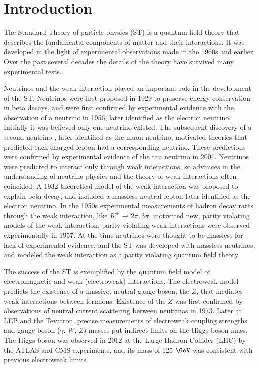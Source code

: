 \chapter{Introduction}
\label{intro_chapter}

The Standard Theory of particle physics (ST) \cite{weinbergSM,salamSM} 
is a quantum field theory that describes the fundamental components of matter and their interactions.  It 
was developed in the light of experimental observations made in the 1960s and earlier.  Over the past 
several decades the details of the theory have survived many experimental tests.

Neutrinos and the weak interaction played an important role in the development of the ST.  
Neutrinos were first proposed in 1929 to preserve energy conservation in beta decays, and were first 
confirmed by experimental evidence \cite{firstNuDiscovery} with the observation of a neutrino in 1956, 
later identified as the electron neutrino.  Initially it was believed only one neutrino existed.  The 
subsequent discovery of a second neutrino \cite{muNuDiscovery}, later identified as the muon neutrino, 
motivated theories that predicted each charged lepton had a corresponding neutrino.  These predictions 
were confirmed by experimental evidence \cite{tauNuDiscovery} of the tau neutrino in 2001.  
Neutrinos were predicted to interact only through weak 
interactions, so advances in the understanding of neutrino physics and the theory of weak interactions often coincided.  
A 1932 theoretical model of the weak interaction was proposed to explain beta decay, and included a massless 
neutral lepton later identified as the electron neutrino.  In the 1950s experimental measurements of 
hadron decay rates through the weak interaction, like $K^{+} \rightarrow 2\pi, 3\pi$, motivated new, 
parity violating models of the weak interaction; parity violating weak interactions were 
observed experimentally \cite{weakParityViolation} in 1957.  At the time neutrinos were thought 
to be massless for lack of experimental evidence, and the ST was developed with massless neutrinos, and 
modeled the weak interaction as a parity violating quantum field theory.

The success of the ST is exemplified by the quantum field model of electromagnetic and weak (electroweak) 
interactions.  The electroweak model predicts the existence of a massive, neutral gauge boson, the $Z$, 
that mediates weak interactions between fermions.  Existence of the $Z$ was first confirmed by 
observations of neutral current scattering between neutrinos \cite{nuScattering} in 1973.  Later at 
LEP and the Tevatron, precise measurements of electroweak coupling strengths and gauge boson ($\gamma$, $W$, $Z$) 
masses put indirect limits on the Higgs boson mass.  The Higgs boson was observed in 2012 at the Large Hadron Collider 
(LHC) by the ATLAS and CMS experiments, and its mass\cite{combinedHiggsResult} of 125 $\GeV$ was consistent 
with previous electroweak limits.


